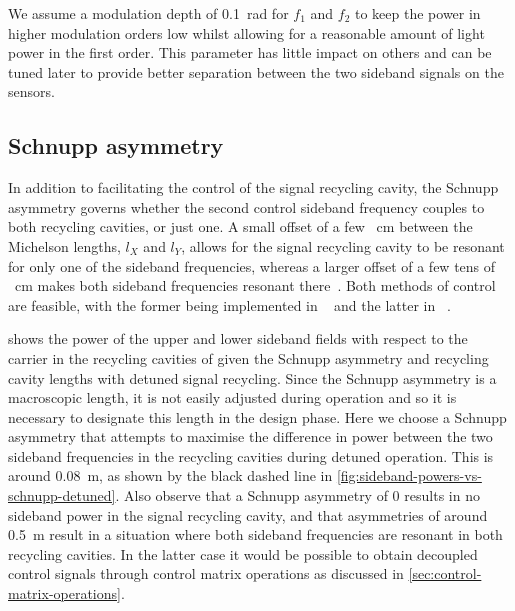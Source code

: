We assume a modulation depth of \SI{0.1}{\radian} for $f_1$ and $f_2$ to keep the power in higher modulation orders low whilst allowing for a reasonable amount of light power in the first order. This parameter has little impact on others and can be tuned later to provide better separation between the two sideband signals on the sensors.

\subsection{Schnupp asymmetry}
In addition to facilitating the control of the signal recycling cavity, the Schnupp asymmetry governs whether the second control sideband frequency couples to both recycling cavities, or just one. A small offset of a few \SI{}{\centi\meter} between the Michelson lengths, $l_X$ and $l_Y$, allows for the signal recycling cavity to be resonant for only one of the sideband frequencies, whereas a larger offset of a few tens of \SI{}{\centi\meter} makes both sideband frequencies resonant there~\cite{Vajente2008}. Both methods of control are feasible, with the former being implemented in \ALIGO{}~\cite{Abbott2010} and the latter in \KAGRA{}~\cite{kagra2013}.

 shows the power of the upper and lower sideband fields with respect to the carrier in the recycling cavities of \ETLF{} given the Schnupp asymmetry and recycling cavity lengths with detuned signal recycling. Since the Schnupp asymmetry is a macroscopic length, it is not easily adjusted during operation and so it is necessary to designate this length in the design phase. Here we choose a Schnupp asymmetry that attempts to maximise the difference in power between the two sideband frequencies in the recycling cavities during detuned operation. This is around \SI{0.08}{\meter}, as shown by the black dashed line in \cref{fig:sideband-powers-vs-schnupp-detuned}. Also observe that a Schnupp asymmetry of \num{0} results in no sideband power in the signal recycling cavity, and that asymmetries of around \SI{0.5}{\meter} result in a situation where both sideband frequencies are resonant in both recycling cavities. In the latter case it would be possible to obtain decoupled control signals through control matrix operations as discussed in \cref{sec:control-matrix-operations}.

